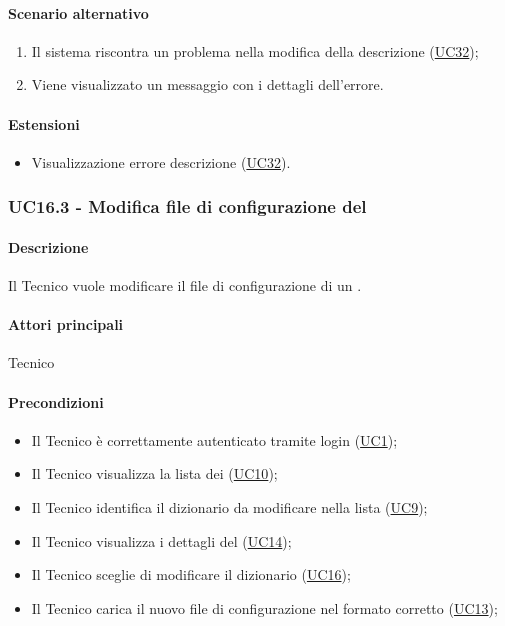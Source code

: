 \paragraph*{Scenario alternativo}
\begin{enumerate}
  \item Il sistema riscontra un problema nella modifica della descrizione (\hyperref[UC32]{UC32});
  \item Viene visualizzato un messaggio con i dettagli dell'errore.
\end{enumerate}

\paragraph*{Estensioni}
\begin{itemize}
  \item Visualizzazione errore descrizione  (\hyperref[UC32]{UC32}).
\end{itemize}


\subsubsection{UC16.3 - Modifica file di configurazione del }\label{UC16point3}
\paragraph*{Descrizione}
Il Tecnico vuole modificare il file di configurazione di un .

\paragraph*{Attori principali}
Tecnico

\paragraph*{Precondizioni}
\begin{itemize}
  \item Il Tecnico è correttamente autenticato tramite login (\hyperref[UC1]{UC1});
  \item Il Tecnico visualizza la lista dei  (\hyperref[UC10]{UC10});
  \item Il Tecnico identifica il dizionario da modificare nella lista (\hyperref[UC9]{UC9});
  \item Il Tecnico visualizza i dettagli del  (\hyperref[UC14]{UC14});
  \item Il Tecnico sceglie di modificare il dizionario (\hyperref[UC16]{UC16});
  \item Il Tecnico carica il nuovo file di configurazione nel formato corretto (\hyperref[UC13]{UC13});
\end{itemize}


